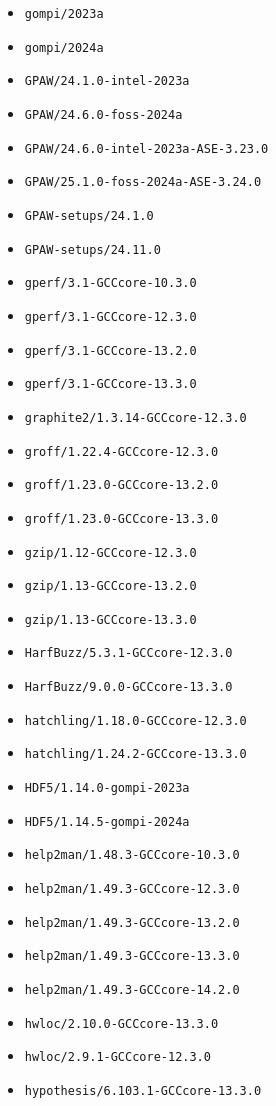 \begin{multicols}{3}
\begin{itemize}
\item \verb|gompi/2023a|
\item \verb|gompi/2024a|
\item \verb|GPAW/24.1.0-intel-2023a|
\item \verb|GPAW/24.6.0-foss-2024a|
\item \verb|GPAW/24.6.0-intel-2023a-ASE-3.23.0|
\item \verb|GPAW/25.1.0-foss-2024a-ASE-3.24.0|
\item \verb|GPAW-setups/24.1.0|
\item \verb|GPAW-setups/24.11.0|
\item \verb|gperf/3.1-GCCcore-10.3.0|
\item \verb|gperf/3.1-GCCcore-12.3.0|
\item \verb|gperf/3.1-GCCcore-13.2.0|
\item \verb|gperf/3.1-GCCcore-13.3.0|
\item \verb|graphite2/1.3.14-GCCcore-12.3.0|
\item \verb|groff/1.22.4-GCCcore-12.3.0|
\item \verb|groff/1.23.0-GCCcore-13.2.0|
\item \verb|groff/1.23.0-GCCcore-13.3.0|
\item \verb|gzip/1.12-GCCcore-12.3.0|
\item \verb|gzip/1.13-GCCcore-13.2.0|
\item \verb|gzip/1.13-GCCcore-13.3.0|
\item \verb|HarfBuzz/5.3.1-GCCcore-12.3.0|
\item \verb|HarfBuzz/9.0.0-GCCcore-13.3.0|
\item \verb|hatchling/1.18.0-GCCcore-12.3.0|
\item \verb|hatchling/1.24.2-GCCcore-13.3.0|
\item \verb|HDF5/1.14.0-gompi-2023a|
\item \verb|HDF5/1.14.5-gompi-2024a|
\item \verb|help2man/1.48.3-GCCcore-10.3.0|
\item \verb|help2man/1.49.3-GCCcore-12.3.0|
\item \verb|help2man/1.49.3-GCCcore-13.2.0|
\item \verb|help2man/1.49.3-GCCcore-13.3.0|
\item \verb|help2man/1.49.3-GCCcore-14.2.0|
\item \verb|hwloc/2.10.0-GCCcore-13.3.0|
\item \verb|hwloc/2.9.1-GCCcore-12.3.0|
\item \verb|hypothesis/6.103.1-GCCcore-13.3.0|

\end{itemize}
\end{multicols}
